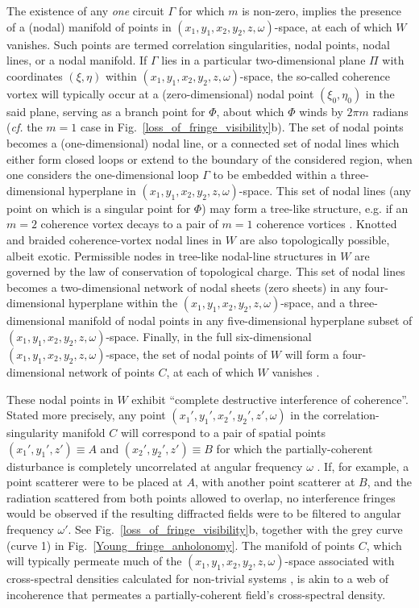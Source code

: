 \documentclass{iucr}              %
\newcommand{\inblue}[1]{{\color{blue}#1}}
\begin{document}
The existence of any {\em one} circuit $\Gamma$ for which $m$ is non-zero, implies the presence of a (nodal) manifold of points in $(x_1,y_1,x_2,y_2,z,\omega)$-space, at each of which $W$ vanishes.   Such points are termed correlation singularities, nodal points, nodal lines, or a nodal manifold.  If $\Gamma$ lies in a particular two-dimensional plane $\Pi$ with coordinates $(\xi,\eta)$ within $(x_1,y_1,x_2,y_2,z,\omega)$-space, the so-called coherence vortex \cite{GburVisser2003} will typically occur at a (zero-dimensional) nodal point $(\xi_0,\eta_0)$ in the said plane, serving as a branch point for $\Phi$, about which $\Phi$ winds by $2 \pi m$ radians ({\em cf.} the $m=1$ case in Fig.~\ref{loss_of_fringe_visibility}b).  The set of nodal points becomes a (one-dimensional) nodal line, or a connected set of nodal lines which either form closed loops or extend to the boundary of the considered region, when one considers the one-dimensional loop $\Gamma$ to be embedded within a three-dimensional hyperplane in  $(x_1,y_1,x_2,y_2,z,\omega)$-space.  This set of nodal lines (any point on which is a singular point for $\Phi$) may form a tree-like structure, e.g. if an $m=2$ coherence vortex decays to a pair of $m=1$ coherence vortices \cite{TopologicalReactionsCohVortices,GburSPIE}.  Knotted and braided coherence-vortex nodal lines in $W$ are also topologically possible, albeit exotic.  Permissible nodes in tree-like nodal-line structures in $W$ are governed by the law of conservation of topological charge.  This set of nodal lines becomes a two-dimensional network of nodal sheets (zero sheets) in any four-dimensional hyperplane within the $(x_1,y_1,x_2,y_2,z,\omega)$-space, and a three-dimensional manifold of nodal points in any five-dimensional hyperplane subset of $(x_1,y_1,x_2,y_2,z,\omega)$-space.  Finally, in the full six-dimensional $(x_1,y_1,x_2,y_2,z,\omega)$-space, the set of nodal points of $W$ will form a four-dimensional network of points $C$, at each of which $W$ vanishes \cite{Marasinghe2010}.  

These nodal points in $W$ exhibit ``complete destructive interference of coherence''.  Stated more precisely, any point $(x_1',y_1',x_2',y_2',z',\omega)$ in the correlation-singularity manifold $C$ will correspond to a pair of spatial points $(x_1',y_1',z')\equiv A$ and $(x_2',y_2',z')\equiv B$ for which the partially-coherent disturbance is completely uncorrelated at angular frequency $\omega$ \cite{Schouten2003,GburVisser2003,Bogatyryova2003}.  If, for example, a point scatterer were to be placed at $A$, with another point scatterer at $B$, and the radiation scattered from both points allowed to overlap, no interference fringes would be observed if the resulting diffracted fields were to be filtered to angular frequency $\omega'$.  See \inblue{Fig.~\ref{loss_of_fringe_visibility}b}, together with the grey curve (curve 1) in \inblue{Fig.~\ref{Young_fringe_anholonomy}}.  The manifold of points $C$, which will typically permeate much of the $(x_1,y_1,x_2,y_2,z,\omega)$-space associated with cross-spectral densities calculated for non-trivial systems \cite{TopologicalReactionsCohVortices,GburVisser2003}, is akin to a web of incoherence that permeates a partially-coherent field's cross-spectral density.
\end{document}
